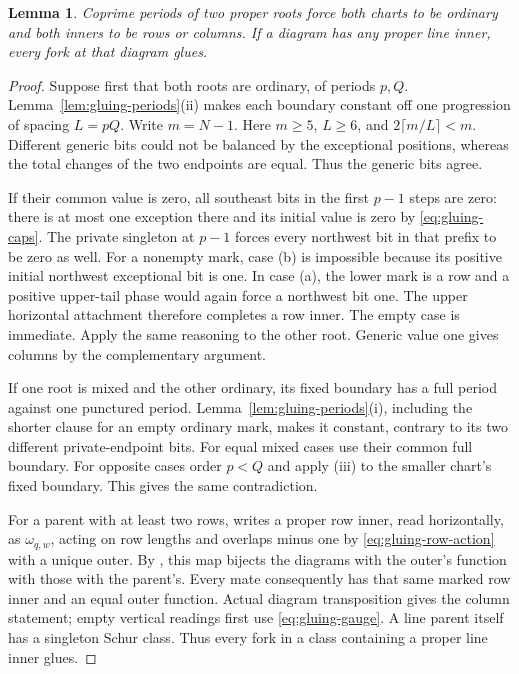 \documentclass[11pt,a4paper]{amsart}
\numberwithin{equation}{section}
\theoremstyle{plain}
\newtheorem{lemma}[theorem]{Lemma}
\theoremstyle{definition}
\begin{document}
\begin{lemma}\label{lem:gluing-lines}
Coprime periods of two proper roots force both charts to be ordinary and both inners to be rows or columns.  If a diagram has any proper line inner, every fork at that diagram glues.
\end{lemma}
\begin{proof}
Suppose first that both roots are ordinary, of periods \(p,Q\).  Lemma~\ref{lem:gluing-periods}(ii) makes each boundary constant off one progression of spacing \(L=pQ\).  Write \(m=N-1\).  Here \(m\ge5\), \(L\ge6\), and \(2\lceil m/L\rceil<m\).  Different generic bits could not be balanced by the exceptional positions, whereas the total changes of the two endpoints are equal.  Thus the generic bits agree.

If their common value is zero, all southeast bits in the first \(p-1\) steps are zero: there is at most one exception there and its initial value is zero by \eqref{eq:gluing-caps}.  The private singleton at \(p-1\) forces every northwest bit in that prefix to be zero as well.  For a nonempty mark, case (b) is impossible because its positive initial northwest exceptional bit is one.  In case (a), the lower mark is a row and a positive upper-tail phase would again force a northwest bit one.  The upper horizontal attachment therefore completes a row inner.  The empty case is immediate.  Apply the same reasoning to the other root.  Generic value one gives columns by the complementary argument.

If one root is mixed and the other ordinary, its fixed boundary has a full period against one punctured period.  Lemma~\ref{lem:gluing-periods}(i), including the shorter clause for an empty ordinary mark, makes it constant, contrary to its two different private-endpoint bits.  For equal mixed cases use their common full boundary.  For opposite cases order \(p<Q\) and apply (iii) to the smaller chart's fixed boundary.  This gives the same contradiction.

For a parent with at least two rows,  writes a proper row inner, read horizontally, as \(\omega_{q,w}\), acting on row lengths and overlaps minus one by \eqref{eq:gluing-row-action} with a unique outer.  By , this map bijects the diagrams with the outer's function with those with the parent's.  Every mate consequently has that same marked row inner and an equal outer function.  Actual diagram transposition gives the column statement; empty vertical readings first use \eqref{eq:gluing-gauge}.  A line parent itself has a singleton Schur class.  Thus every fork in a class containing a proper line inner glues.
\end{proof}
\end{document}
